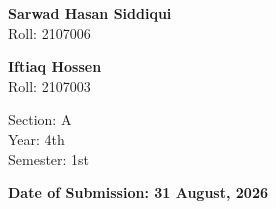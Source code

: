 \documentclass[11pt]{article}
\begin{document}
\begin{titlepage}
\begin{minipage}[t]{0.32\textwidth}
\vspace{0.45cm}
\textbf{Sarwad Hasan Siddiqui}\\
Roll: 2107006

\vspace{0.35cm}
\textbf{Iftiaq Hossen}\\
Roll: 2107003

\vspace{0.4cm}
Section: A\\
Year: 4th\\
Semester: 1st
\end{minipage}

\vfill

{\large\bfseries Date of Submission: 31 August, 2026}

\vspace*{0.5cm}
\end{titlepage}
\end{document}
